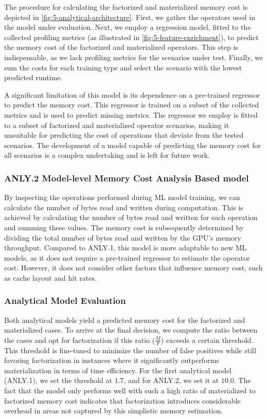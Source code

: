 The procedure for calculating the factorized and materialized memory cost is depicted in \autoref{fig:5-analytical-architecture}. First, we gather the operators used in the model under evaluation. Next, we employ a regression model, fitted to the collected profiling metrics (as illustrated in \autoref{fig:5-feature-enrichment}), to predict the memory cost of the factorized and materialized operators. This step is indispensable, as we lack profiling metrics for the scenarios under test. Finally, we sum the costs for each training type and select the scenario with the lowest predicted runtime.

A significant limitation of this model is its dependence on a pre-trained regressor to predict the memory cost. This regressor is trained on a subset of the collected metrics and is used to predict missing metrics. The regressor we employ is fitted to a subset of factorized and materialized operator scenarios, making it unsuitable for predicting the cost of operations that deviate from the tested scenarios. The development of a model capable of predicting the memory cost for all scenarios is a complex undertaking and is left for future work.

\subsubsection*{ANLY.2 Model-level Memory Cost Analysis Based model}
By inspecting the operations performed during ML model training, we can calculate the number of bytes read and written during computation. This is achieved by calculating the number of bytes read and written for each operation and summing these values. The memory cost is subsequently determined by dividing the total number of bytes read and written by the GPU’s memory throughput. Compared to ANLY.1, this model is more adaptable to new ML models, as it does not require a pre-trained regressor to estimate the operator cost. However, it does not consider other factors that influence memory cost, such as cache layout and hit rates.

\subsubsection{Analytical Model Evaluation}
Both analytical models yield a predicted memory cost for the factorized and materialized cases. To arrive at the final decision, we compute the ratio between the cases and opt for factorization if this ratio ($\frac{M}{F}$) exceeds a certain threshold. This threshold is fine-tuned to minimize the number of false positives while still favoring factorization in instances where it significantly outperforms materialization in terms of time efficiency. For the first analytical model (ANLY.1), we set the threshold at $1.7$, and for ANLY.2, we set it at $10.0$. The fact that the model only performs well with such a high ratio of materialized to factorized memory cost indicates that factorization introduces considerable overhead in areas not captured by this simplistic memory estimation.

